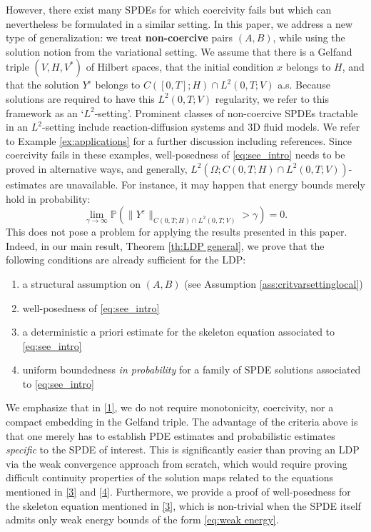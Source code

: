 \documentclass{amsart}
\newcommand{\<}{\langle}
\newcommand{\?}{\rangle}
\theoremstyle{plain}
\theoremstyle{remark}
\theoremstyle{plain}
\numberwithin{equation}{section}
\renewcommand{\P}{\mathbb{P}}
\newcommand{\Om}{\Omega}
\newcommand{\eps}{\varepsilon}
\begin{document}
However, there exist many SPDEs for which coercivity fails but which can nevertheless be formulated in a similar setting. 
In this paper, we address a new type of generalization: we treat \textbf{non-coercive} pairs $(A,B)$, while using the solution notion from the variational setting. We assume that there is a Gelfand triple $(V,H,V^*)$ of Hilbert spaces, that the initial condition $x$ belongs to $H$, and that the solution $Y^\eps$ belongs to  $C([0,T];H)\cap L^2(0,T;V)$ a.s. Because solutions are required to have this $L^2(0,T;V)$ regularity, we refer to this framework as an `$L^2$-setting'.   
Prominent classes of non-coercive SPDEs tractable in an $L^2$-setting include reaction-diffusion systems and 3D fluid models.  
We refer to Example \ref{ex:applications} for a further discussion including references.   
Since coercivity fails in these examples, well-posedness of \eqref{eq:see_intro} needs to be proved in alternative ways, and generally, $L^2(\Om;C(0,T;H)\cap L^2(0,T;V))$-estimates are unavailable. 
For instance, it may happen that energy bounds merely hold in probability:
\begin{equation}\label{eq:weak energy}
  \lim_{\gamma\to\infty}\P(\|Y^\eps\|_{C(0,T;H)\cap L^2(0,T;V)}>\gamma)=0. 
\end{equation}
This does not pose a problem for applying the results presented in this paper. Indeed, in our main result, Theorem \ref{th:LDP general}, we prove that the following conditions are already sufficient for the LDP:
\begin{enumerate}[label=\textup{\roman*.},ref=\textup{\roman*.}]
  \item\label{1} a structural assumption on $(A,B)$ (see Assumption \ref{ass:critvarsettinglocal}) 
  \item\label{2} well-posedness of \eqref{eq:see_intro}
  \item\label{3} a deterministic a priori estimate  for the skeleton equation associated to \eqref{eq:see_intro}
  \item\label{4} uniform boundedness \emph{in probability} for a family of SPDE solutions associated to \eqref{eq:see_intro} 
\end{enumerate}
We emphasize that in \ref{1}, we do not require monotonicity, coercivity, nor a compact embedding in the Gelfand triple. 
The advantage of the criteria above is that  one merely  has to establish  PDE estimates and probabilistic estimates   \emph{specific} to the SPDE of interest. This is significantly easier than   proving an LDP  via the weak convergence approach from scratch, which would require proving difficult continuity properties of the solution maps related to  the equations mentioned in \ref{3} and \ref{4}.  
Furthermore, we provide a proof of well-posedness for the skeleton equation mentioned in \ref{3}, which is non-trivial when the SPDE itself admits only weak energy bounds of the form \eqref{eq:weak energy}. 
\end{document}
